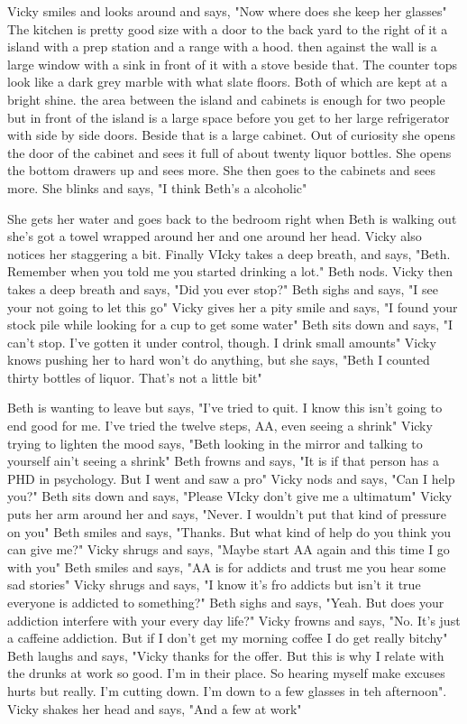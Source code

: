 \documentclass{article}[12px]
\begin{document}
    Vicky smiles and looks around and says, "Now where does she keep her glasses" The kitchen is pretty good size with a door to the back yard to the right of it a island with a prep station and a range with a hood. then against the wall is a large window with a sink in front of it with a stove beside that. The counter tops look like a dark grey marble with what slate floors. Both of which are kept at a bright shine. the area between the island and cabinets is enough for two people but in front of the island is a large space before you get to her large refrigerator with side by side doors. Beside that is a large cabinet. Out of curiosity she opens the door of the cabinet and sees it full of about twenty liquor bottles. She opens the bottom drawers up and sees more. She then goes to the cabinets and sees more. She blinks and says, "I think Beth's a alcoholic"

    She gets her water and goes back to the bedroom right when Beth is walking out she's got a towel wrapped around her and one around her head. Vicky also notices her staggering a bit. Finally VIcky takes a deep breath, and says, "Beth. Remember when you told me you started drinking a lot." Beth nods. Vicky then takes a deep breath and says, "Did you ever stop?" Beth sighs and says, "I see your not going to let this go" Vicky gives her a pity smile and says, "I found your stock pile while looking for a cup to get some water" Beth sits down and says, "I can't stop. I've gotten it under control, though. I drink small amounts" Vicky knows pushing her to hard won't do anything, but she says, "Beth I counted thirty bottles of liquor. That's not a little bit" 

    Beth is wanting to leave but says, "I've tried to quit. I know this isn't going to end good for me. I've tried the twelve steps, AA, even seeing a shrink" Vicky trying to lighten the mood says, "Beth looking in the mirror and talking to yourself ain't seeing a shrink" Beth frowns and says, "It is if that person has a PHD in psychology. But I went and saw a pro" Vicky nods and says, "Can I help you?" Beth sits down and says, "Please VIcky don't give me a ultimatum" Vicky puts her arm around her and says, "Never. I wouldn't put that kind of pressure on you" Beth smiles and says, "Thanks. But what kind of help do you think you can give me?" Vicky shrugs and says, "Maybe start AA again and this time I go with you" Beth smiles and says, "AA is for addicts and trust me you hear some sad stories" Vicky shrugs and says, "I know it's fro addicts but isn't it true everyone is addicted to something?" Beth sighs and says, "Yeah. But does your addiction interfere  with your every day life?" Vicky frowns and says, "No. It's just a caffeine addiction. But if I don't get my morning coffee I do get really bitchy" Beth laughs and says, "Vicky thanks for the offer. But this is why I relate with the drunks at work so good. I'm in their place. So hearing myself make excuses hurts but really. I'm cutting down. I'm down to a few glasses in teh afternoon". Vicky shakes her head and says, "And a few at work"
\end{document}
